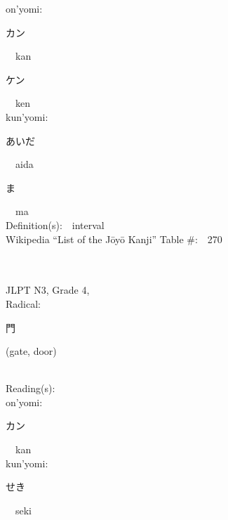 \begin{multicols}{2}
{\hspace*{1em}}on'yomi:\ \ \\
{\hspace*{2em}}{\begin{CJK}{UTF8}{min} カン \end{CJK}}\ \ kan\ \ \\
{\hspace*{2em}}{\begin{CJK}{UTF8}{min} ケン \end{CJK}}\ \ ken\ \ \\
{\hspace*{1em}}kun'yomi:\ \ \\
{\hspace*{2em}}{\begin{CJK}{UTF8}{min} あいだ \end{CJK}}\ \ aida\ \ \\
{\hspace*{2em}}{\begin{CJK}{UTF8}{min} ま \end{CJK}}\ \ ma\ \ \\
Definition(s):\ \ interval \\
Wikipedia ``List of the J\=oy\=o Kanji'' Table \#:\ \ 270 \\
\ \ \\
{\fontsize{34pt}{40pt}  }\ \ \\  %
{JLPT N3, Grade 4, \\Radical:\ \ {\begin{CJK}{UTF8}{min} 門 \end{CJK}} (gate, door) } \\
Reading(s):\ \ \\
{\hspace*{1em}}on'yomi:\ \ \\
{\hspace*{2em}}{\begin{CJK}{UTF8}{min} カン \end{CJK}}\ \ kan\ \ \\
{\hspace*{1em}}kun'yomi:\ \ \\
{\hspace*{2em}}{\begin{CJK}{UTF8}{min} せき \end{CJK}}\ \ seki\ \ \\

\end{multicols}
